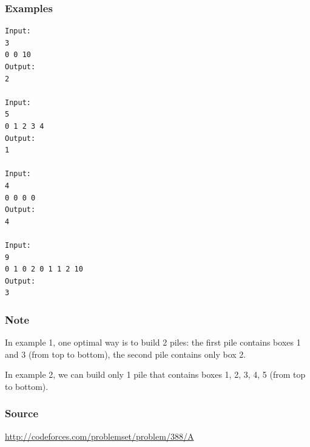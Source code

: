 \subsubsection*{Examples}
\begin{verbatim}
Input:
3
0 0 10
Output:
2

Input:
5
0 1 2 3 4
Output:
1

Input:
4
0 0 0 0
Output:
4

Input:
9
0 1 0 2 0 1 1 2 10
Output:
3
\end{verbatim}

\subsubsection*{Note}
In example 1, one optimal way is to build 2 piles: the first pile contains boxes 1 and 3 (from top to bottom), the second pile contains only box 2.

In example 2, we can build only 1 pile that contains boxes 1, 2, 3, 4, 5 (from top to bottom).

\subsubsection*{Source} \url{http://codeforces.com/problemset/problem/388/A}
